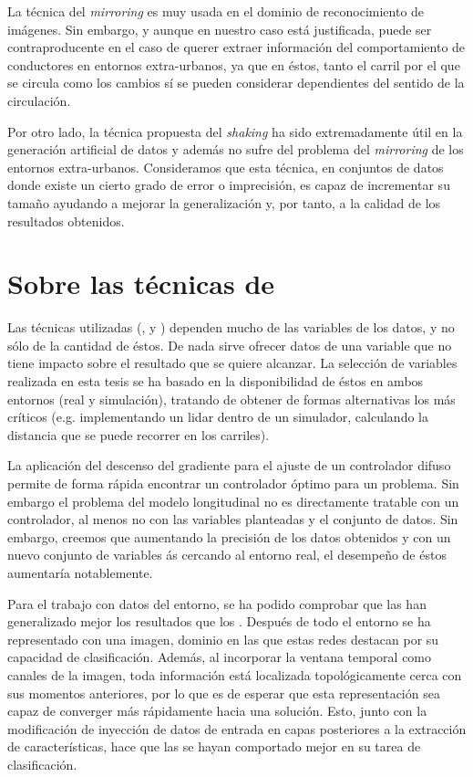 La técnica del \textit{mirroring} es muy usada en el dominio de reconocimiento de imágenes. Sin embargo, y aunque en nuestro caso está justificada, puede ser contraproducente en el caso de querer extraer información del comportamiento de conductores en entornos extra-urbanos, ya que en éstos, tanto el carril por el que se circula como los cambios sí se pueden considerar dependientes del sentido de la circulación.

Por otro lado, la técnica propuesta del \textit{shaking} ha sido extremadamente útil en la generación artificial de datos y además no sufre del problema del \textit{mirroring} de los entornos extra-urbanos. Consideramos que esta técnica, en conjuntos de datos donde existe un cierto grado de error o imprecisión, es capaz de incrementar su tamaño ayudando a mejorar la generalización y, por tanto, a la calidad de los resultados obtenidos.

\section{Sobre las técnicas de }

Las técnicas utilizadas (,  y ) dependen mucho de las variables de los datos, y no sólo de la cantidad de éstos. De nada sirve ofrecer datos de una variable que no tiene impacto sobre el resultado que se quiere alcanzar. La selección de variables realizada en esta tesis se ha basado en la disponibilidad de éstos en ambos entornos (real y simulación), tratando de obtener de formas alternativas los más críticos (e.g. implementando un \acrshort{lidar} dentro de un simulador, calculando la distancia que se puede recorrer en los carriles).

La aplicación del descenso del gradiente para el ajuste de un controlador difuso permite de forma rápida encontrar un controlador óptimo para un problema. Sin embargo el problema del modelo longitudinal no es directamente tratable con un controlador, al menos no con las variables planteadas y el conjunto de datos. Sin embargo, creemos que aumentando la precisión de los datos obtenidos y con un nuevo conjunto de variables ás cercando al entorno real, el desempeño de éstos aumentaría notablemente.

Para el trabajo con datos del entorno, se ha podido comprobar que las  han generalizado mejor los resultados que los . Después de todo el entorno se ha representado con una imagen, dominio en las que estas redes destacan por su capacidad de clasificación. Además, al incorporar la ventana temporal como canales de la imagen, toda información está localizada topológicamente cerca con sus momentos anteriores, por lo que es de esperar que esta representación sea capaz de converger más rápidamente hacia una solución. Esto, junto con la modificación de inyección de datos de entrada en capas posteriores a la extracción de características, hace que las  se hayan comportado mejor en su tarea de clasificación.

